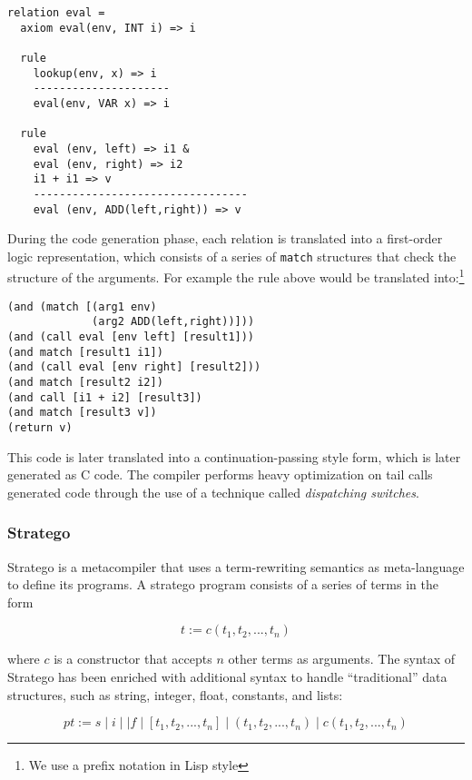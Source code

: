 \begin{lstlisting}
relation eval =
  axiom eval(env, INT i) => i
  
  rule
    lookup(env, x) => i
    ---------------------
    eval(env, VAR x) => i
    
  rule
    eval (env, left) => i1 &
    eval (env, right) => i2
    i1 + i1 => v
    ---------------------------------
    eval (env, ADD(left,right)) => v
\end{lstlisting}

\noindent
During the code generation phase, each relation is translated into a first-order logic representation, which consists of a series of \texttt{match} structures that check the structure of the arguments. For example the rule above would be translated into:\footnote{We use a prefix notation in Lisp style}

\begin{lstlisting}
(and (match [(arg1 env)
             (arg2 ADD(left,right))]))
(and (call eval [env left] [result1]))
(and match [result1 i1])
(and (call eval [env right] [result2]))
(and match [result2 i2])
(and call [i1 + i2] [result3])
(and match [result3 v])
(return v)
\end{lstlisting}

\noindent
This code is later translated into a continuation-passing style form, which is later generated as C code. The compiler performs heavy optimization on tail calls generated code through the use of a technique called \textit{dispatching switches}.

\subsubsection{Stratego}
Stratego \cite{bravenboer2008stratego} is a metacompiler that uses a term-rewriting semantics as meta-language to define its programs. A stratego program consists of a series of terms in the form

\begin{equation*}
t := c(t_{1},t_{2},...,t_{n})
\end{equation*}

\noindent
where $c$ is a constructor that accepts $n$ other terms as arguments. The syntax of Stratego has been enriched with additional syntax to handle ``traditional'' data structures, such as string, integer, float, constants, and lists:

\begin{equation*}
pt := s \; | \; i \; | \; | f \; | \; [t_{1},t_{2},...,t_{n}] \; | \; (t_{1},t_{2},...,t_{n}) \; | \; c(t_{1},t_{2},...,t_{n})
\end{equation*}

